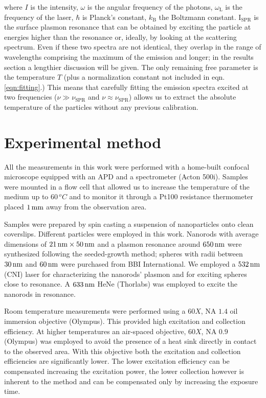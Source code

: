 \noindent where $I$ is the intensity, $\omega$ is the angular frequency of the
photons, $\omega_\textrm{L}$ is the frequency of the laser, $\hbar$ is Planck's
constant, $k_\textrm{B}$ the Boltzmann constant. $\textrm{I}_{\textrm{SPR}}$ is
the surface plasmon resonance that can be obtained by exciting the particle at
energies higher than the resonance or, ideally, by looking at the scattering
spectrum. Even if these two spectra are not identical, they overlap in the range
of wavelengths comprising the maximum of the emission and
longer\cite{Yorulmaz2012}; in the results section a lengthier discussion will be
given. The only remaining free parameter is the temperature $T$ (plus a
normalization constant not included in eqn.
\ref{eqn:fitting}.) This means that carefully fitting the emission spectra
excited at two frequencies ($\nu\gg\nu_{\textrm{SPR}}$ and
$\nu\approx\nu_{\textrm{SPR}}$) allows us to extract the absolute temperature of
the particles without any previous calibration.


\section{Experimental method}
All the measurements in this work were performed with a home-built confocal
microscope equipped with an APD and a spectrometer (Acton 500i). Samples were
mounted in a flow cell that allowed us to increase the temperature of the medium
up to $60\,^oC$ and to monitor it through a Pt100 resistance thermometer placed
$1\,\textrm{mm}$ away from the observation area.

Samples were prepared by spin casting a suspension of nanoparticles onto clean
coverslips. Different particles were employed in this work. Nanorods with
average dimensions of $21\,\textrm{nm}\times50\,\textrm{nm}$ and a plasmon resonance around $650\,\textrm{nm}$
were synthesized following the seeded-growth method\cite{Nikoobakht2003};
spheres with radii between $30\,\textrm{nm}$ and $60\,\textrm{nm}$ were purchased from BBI
International. We employed a $532\,\textrm{nm}$ (CNI) laser for characterizing the
nanorods' plasmon and for exciting spheres close to resonance. A $633\,\textrm{nm}$ HeNe
(Thorlabs) was employed to excite the nanorods in resonance.

Room temperature measurements were performed using a $60X$, NA $1.4$ oil
immersion objective (Olympus). This provided high excitation and collection
efficiency. At higher temperatures an air-spaced objective, $60X$, NA $0.9$
(Olympus) was employed to avoid the presence of a heat sink directly in contact
to the observed area. With this objective both the excitation and collection
efficiencies are significantly lower. The lower excitation efficiency can be
compensated increasing the excitation power, the lower collection however is
inherent to the method and can be compensated only by increasing the exposure
time.

